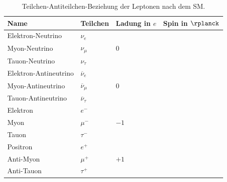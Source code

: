\documentclass[a4paper,12pt]{article}
\begin{document}
\begin{table}[b!]
\centering
\begin{tabular}{p{4cm} >{\centering\arraybackslash} p{1.6cm} >{\centering\arraybackslash} p{2cm} >{\raggedleft\arraybackslash}p{1.6cm}}
Name  					& Teilchen							& Ladung in $e$& Spin in $\unit{\rplanck}$ \\
\midrule
Elektron-Neutrino		&$\nu_e$							&						&\multirow{3}{*}{$+\dfrac{1}{2}$} \\
Myon-Neutrino			&$\nu_\mu$							&$0$					&								\\
Tauon-Neutrino 			&$\nu_\tau$							&						&	\\
\midrule         
Elektron-Antineutrino	&$\overline{\nu}_e$					&						&\multirow{3}{*}{$-\dfrac{1}{2}$}   \\
Myon-Antineutrino		&$\overline{\nu}_\mu$				&$0$						&								\\
Tauon-Antineutrino		&$\overline{\nu}_\tau$				&						&									\\
\midrule
Elektron				&$e^-$								&						&\multirow{3}{*}{$+\dfrac{1}{2}$}  \\
Myon					&$\mu^-$							&$-1$					&									\\
Tauon					&$\tau^-$							&						&									\\
\midrule
Positron				&$e^+$								&						&\multirow{3}{*}{$-\dfrac{1}{2}$}  \\
Anti-Myon				&$\mu^+$							&$+1$					&								\\
Anti-Tauon				&$\tau^+$							&						&									\\
\bottomrule
\end{tabular}
\caption[Teilchen-Antiteilchen-Beziehung der Leptonen. -- Quelle: Autor.]{Teilchen-Antiteilchen-Beziehung der Leptonen nach dem SM.}
\label{tab:lepton}
\end{table}
\end{document}
